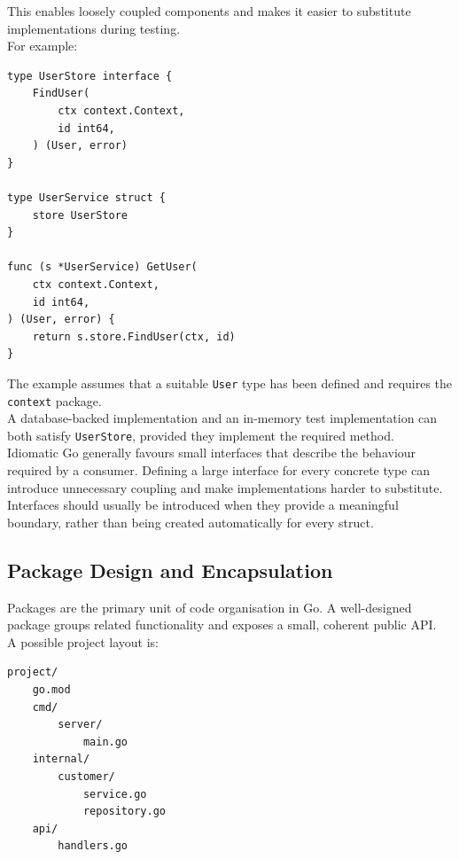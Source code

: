 This enables loosely coupled components and makes it easier to substitute implementations during testing.\\

For example:

\begin{lstlisting}
type UserStore interface {
    FindUser(
        ctx context.Context,
        id int64,
    ) (User, error)
}

type UserService struct {
    store UserStore
}

func (s *UserService) GetUser(
    ctx context.Context,
    id int64,
) (User, error) {
    return s.store.FindUser(ctx, id)
}
\end{lstlisting}

The example assumes that a suitable \texttt{User} type has been defined and requires the \texttt{context} package.\\

A database-backed implementation and an in-memory test implementation can both satisfy \texttt{UserStore}, provided they implement the required method.\\

Idiomatic Go generally favours small interfaces that describe the behaviour required by a consumer. Defining a large interface for every concrete type can introduce unnecessary coupling and make implementations harder to substitute.\\

Interfaces should usually be introduced when they provide a meaningful boundary, rather than being created automatically for every struct.\\

\subsection{Package Design and Encapsulation}

Packages are the primary unit of code organisation in Go. A well-designed package groups related functionality and exposes a small, coherent public API.\\

A possible project layout is:

\begin{lstlisting}
project/
    go.mod
    cmd/
        server/
            main.go
    internal/
        customer/
            service.go
            repository.go
    api/
        handlers.go
\end{lstlisting}

